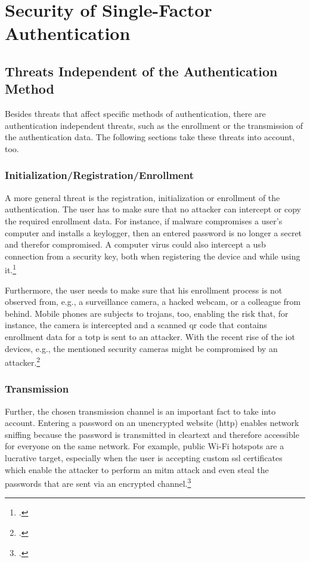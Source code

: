 \chapter{Security of Single-Factor Authentication}
\label{chap:one-factor-security}

\section{Threats Independent of the Authentication Method}

Besides threats that affect specific methods of authentication, there are authentication independent threats, such as the enrollment or the transmission of the authentication data. The following sections take these threats into account, too.

\subsection{Initialization/Registration/Enrollment}

A more general threat is the registration, initialization or enrollment of the authentication. The user has to make sure that no attacker can intercept or copy the required enrollment data. For instance, if malware compromises a user’s computer and installs a keylogger, then an entered password is no longer a secret and therefor compromised. A computer virus could also intercept a \gls{usb} connection from a security key, both when registering the device and while using it.\footcites[See][61]{Ulqinaku:2019:FPP:3317549.3323404}

Furthermore, the user needs to make sure that his enrollment process is not observed from, e.g., a surveillance camera, a hacked webcam, or a colleague from behind. Mobile phones are subjects to trojans, too, enabling the risk that, for instance, the camera is intercepted and a scanned \gls{qr} code that contains enrollment data for a \gls{totp} is sent to an attacker. With the recent rise of the \gls{iot} devices, e.g., the mentioned security cameras might be compromised by an attacker.\footcites[See][152--153]{10.1007/978-3-642-39235-1_9}[See][371--375]{10.1007/978-3-662-45472-5_24}

\subsection{Transmission}

Further, the chosen transmission channel is an important fact to take into account. Entering a password on an unencrypted website (\gls{http}) enables network sniffing because the password is transmitted in cleartext and therefore accessible for everyone on the same network. For example, public Wi-Fi hotspots are a lucrative target, especially when the user is accepting custom \gls{ssl} certificates which enable the attacker to perform an \gls{mitm} attack and even steal the passwords that are sent via an encrypted channel.\footcites[See][518]{10.1007/978-3-030-21548-4_28}

